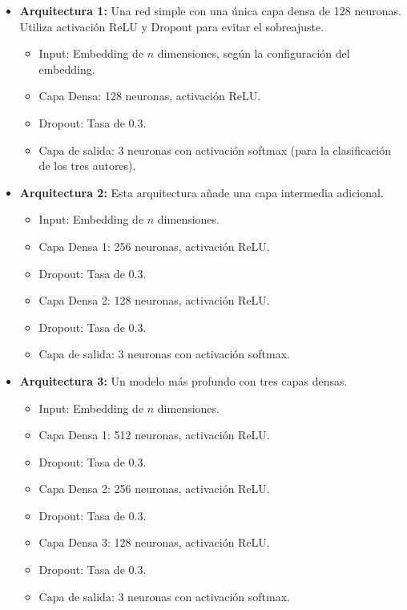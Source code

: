 \documentclass[a4]{article}
\begin{document}
\begin{itemize}
    \item \textbf{Arquitectura 1:} Una red simple con una única capa densa de 128 neuronas. Utiliza activación ReLU y Dropout para evitar el sobreajuste.
    \begin{itemize}
        \item Input: Embedding de $n$ dimensiones, según la configuración del embedding.
        \item Capa Densa: 128 neuronas, activación ReLU.
        \item Dropout: Tasa de 0.3.
        \item Capa de salida: 3 neuronas con activación softmax (para la clasificación de los tres autores).
    \end{itemize}
    
    \item \textbf{Arquitectura 2:} Esta arquitectura añade una capa intermedia adicional.
    \begin{itemize}
        \item Input: Embedding de $n$ dimensiones.
        \item Capa Densa 1: 256 neuronas, activación ReLU.
        \item Dropout: Tasa de 0.3.
        \item Capa Densa 2: 128 neuronas, activación ReLU.
        \item Dropout: Tasa de 0.3.
        \item Capa de salida: 3 neuronas con activación softmax.
    \end{itemize}
    
    \item \textbf{Arquitectura 3:} Un modelo más profundo con tres capas densas.
    \begin{itemize}
        \item Input: Embedding de $n$ dimensiones.
        \item Capa Densa 1: 512 neuronas, activación ReLU.
        \item Dropout: Tasa de 0.3.
        \item Capa Densa 2: 256 neuronas, activación ReLU.
        \item Dropout: Tasa de 0.3.
        \item Capa Densa 3: 128 neuronas, activación ReLU.
        \item Dropout: Tasa de 0.3.
        \item Capa de salida: 3 neuronas con activación softmax.
    \end{itemize}
\end{itemize}
\end{document}
